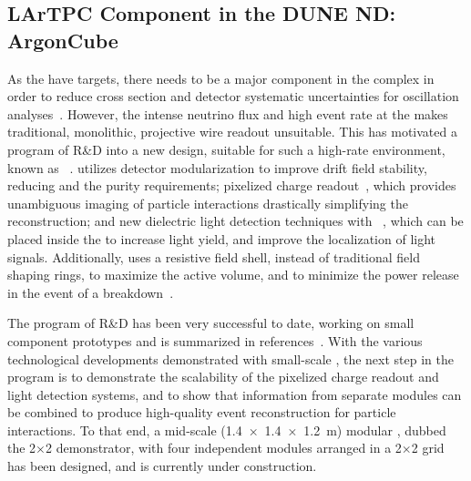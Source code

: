 \subsection{LArTPC Component in the DUNE ND: ArgonCube}
\label{sec:appx-nd:lartpc}


As the   have  targets, there needs to be a major  component in the    complex in order to reduce cross section and detector systematic uncertainties for oscillation analyses~\cite{Acciarri:2016crz, Acciarri:2015uup}. However, the intense neutrino flux and high event rate at the   makes traditional, monolithic, projective wire readout  unsuitable.  This has motivated a program of R\&D into a new  design, suitable for such a high-rate environment, known as ~\cite{argoncube_loi}.  utilizes detector modularization to improve drift field stability, reducing  and the  purity requirements; pixelized charge readout~\cite{Asaadi:2018oxk, larpix}, which provides unambiguous \threed imaging of particle interactions drastically simplifying the reconstruction; and new dielectric light detection techniques with ~\cite{Auger:2017flc}, which can be placed inside the  to increase light yield, and improve the localization of light signals. Additionally,  uses a resistive field shell, instead of traditional field shaping rings, to maximize the active volume, and to minimize the power release in the event of a breakdown~\cite{bib:docdb10419}. %

The program of  R\&D has been very successful to date, working on small component prototypes and is summarized in references~\cite{ Ereditato:2013xaa, Zeller:2013sva, art_cold_ero, Asaadi:2018oxk, Cavanna:2014iqa, larpix, bib:docdb10419, Auger:2017flc}. 
With the various technological developments demonstrated with small-scale , the next step in the  program is to demonstrate the scalability of the pixelized charge readout and light detection systems, and to show that information from separate modules can be combined to produce high-quality event reconstruction for particle interactions. To that end, a mid-scale (\SI[product-units=repeat]{1.4x1.4x1.2}{\metre}) modular , dubbed the  2$\times$2 demonstrator, with four independent  modules arranged in a 2$\times$2 grid has been designed, and is currently under construction. 

